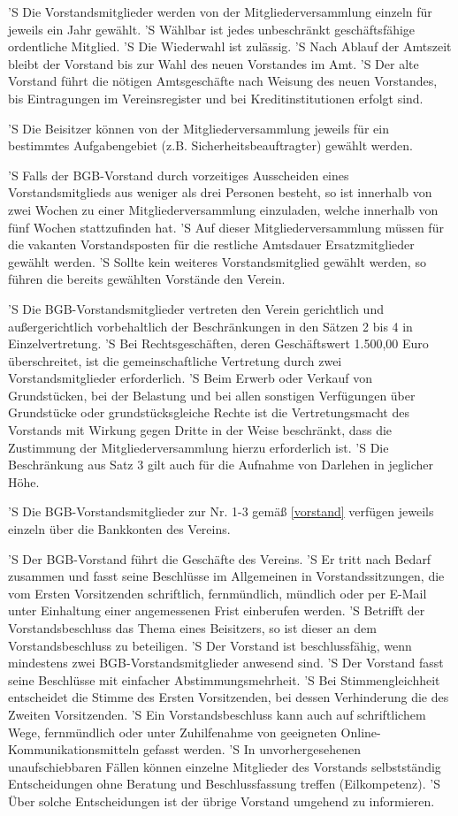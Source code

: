 \documentclass[a4paper,10pt]{scrreprt}
\begin{document}
\begin{contract}
'S Die Vorstandsmitglieder werden von der Mitgliederversammlung einzeln für
jeweils ein Jahr gewählt.
'S Wählbar ist jedes unbeschränkt geschäftsfähige ordentliche Mitglied.
'S Die Wiederwahl ist zulässig.
'S Nach Ablauf der Amtszeit bleibt der Vorstand bis zur Wahl des
neuen Vorstandes im Amt.
'S Der alte Vorstand führt die nötigen Amtsgeschäfte nach Weisung des neuen
Vorstandes, bis Eintragungen im Vereinsregister und bei Kreditinstitutionen
erfolgt sind.

'S Die Beisitzer können von der Mitgliederversammlung jeweils für ein
bestimmtes Aufgabengebiet (z.B. Sicherheitsbeauftragter) gewählt werden.

'S Falls der BGB-Vorstand durch vorzeitiges Ausscheiden eines Vorstandsmitglieds
aus weniger als drei Personen besteht, so ist innerhalb von zwei Wochen zu
einer Mitgliederversammlung einzuladen, welche innerhalb von fünf Wochen
stattzufinden hat.
'S Auf dieser Mitgliederversammlung müssen für die vakanten Vorstandsposten für
die restliche Amtsdauer Ersatzmitglieder gewählt werden.
'S Sollte kein weiteres Vorstandsmitglied gewählt werden, so führen die bereits
gewählten Vorstände den Verein.

'S Die BGB-Vorstandsmitglieder vertreten den Verein gerichtlich und
außergerichtlich vorbehaltlich der Beschränkungen in den Sätzen 2 bis 4 in
Einzelvertretung.
'S Bei Rechtsgeschäften, deren Geschäftswert 1.500,00 Euro überschreitet, ist
die gemeinschaftliche Vertretung durch zwei Vorstandsmitglieder erforderlich.
'S Beim Erwerb oder Verkauf von Grundstücken, bei der Belastung und bei allen
sonstigen Verfügungen über Grundstücke oder grundstücksgleiche Rechte ist die
Vertretungsmacht des Vorstands mit Wirkung gegen Dritte in der Weise
beschränkt, dass die Zustimmung der Mitgliederversammlung hierzu erforderlich
ist.
'S Die Beschränkung aus Satz 3 gilt auch für die Aufnahme von Darlehen in
jeglicher Höhe.

'S Die BGB-Vorstandsmitglieder zur Nr. 1-3 gemäß \ref{vorstand} verfügen
jeweils einzeln über die Bankkonten des Vereins.

'S Der BGB-Vorstand führt die Geschäfte des Vereins.
'S Er tritt nach Bedarf zusammen und fasst seine Beschlüsse im Allgemeinen in
Vorstandssitzungen, die vom Ersten Vorsitzenden schriftlich, fernmündlich,
mündlich oder per E-Mail unter Einhaltung einer angemessenen Frist einberufen
werden.
'S Betrifft der Vorstandsbeschluss das Thema eines Beisitzers, so ist dieser
an dem Vorstandsbeschluss zu beteiligen.
'S Der Vorstand ist beschlussfähig, wenn mindestens zwei BGB-Vorstandsmitglieder
anwesend sind.
'S Der Vorstand fasst seine Beschlüsse mit einfacher Abstimmungsmehrheit.
'S Bei Stimmengleichheit entscheidet die Stimme des Ersten Vorsitzenden, bei
dessen Verhinderung die des Zweiten Vorsitzenden.
'S Ein Vorstandsbeschluss kann auch auf schriftlichem Wege, fernmündlich oder
unter Zuhilfenahme von geeigneten Online-Kommunikationsmitteln gefasst werden.
'S In unvorhergesehenen unaufschiebbaren Fällen können einzelne Mitglieder des
Vorstands selbstständig Entscheidungen ohne Beratung und Beschlussfassung
treffen (Eilkompetenz).
'S Über solche Entscheidungen ist der übrige Vorstand umgehend zu informieren.


\end{contract}
\end{document}
